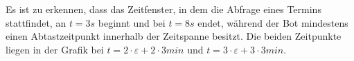 Es ist zu erkennen, dass das Zeitfenster, in dem die Abfrage eines Termins stattfindet, an $t=3s$ beginnt und bei $t=8s$ endet, während der Bot mindestens einen Abtastzeitpunkt innerhalb der Zeitspanne besitzt. Die beiden Zeitpunkte liegen in der Grafik bei $t=2 \cdot \varepsilon + 2\cdot 3min$ und $t=3\cdot \varepsilon + 3\cdot 3min$.



